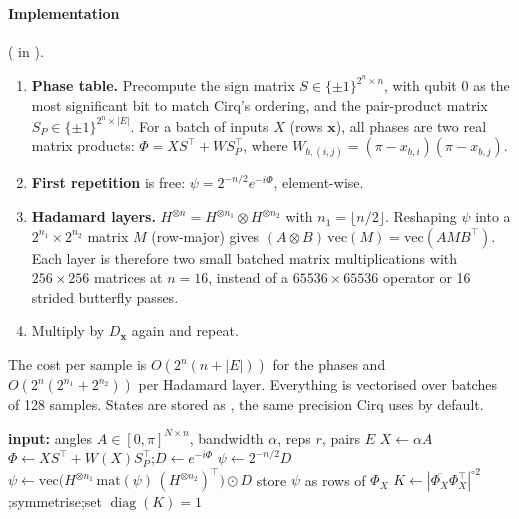 \paragraph{Implementation} ( in ).
\begin{enumerate}
\item \textbf{Phase table.} Precompute the sign matrix $S\in\{\pm1\}^{2^n\times n}$, with qubit 0
      as the most significant bit to match Cirq's ordering, and the pair-product matrix
      $S_P\in\{\pm1\}^{2^n\times|E|}$. For a batch of inputs $X$ (rows $\bm x$), all phases are
      two real matrix products:
      $\Phi = X S^\top + W S_P^\top$, where $W_{b,(i,j)}=(\pi-x_{b,i})(\pi-x_{b,j})$.
\item \textbf{First repetition} is free: $\psi=2^{-n/2}e^{-i\Phi}$, element-wise.
\item \textbf{Hadamard layers.} $H^{\otimes n}=H^{\otimes n_1}\otimes H^{\otimes n_2}$ with
      $n_1=\lfloor n/2\rfloor$. Reshaping $\psi$ into a $2^{n_1}\times2^{n_2}$ matrix $M$ (row-major)
      gives $(A\otimes B)\,\mathrm{vec}(M)=\mathrm{vec}(AMB^\top)$. Each layer is therefore two
      small batched matrix multiplications with $256\times256$ matrices at $n=16$, instead of a
      $65536\times65536$ operator or 16 strided butterfly passes.
\item Multiply by $D_{\bm x}$ again and repeat.
\end{enumerate}
The cost per sample is $O(2^n(n+|E|))$ for the phases and $O(2^n(2^{n_1}+2^{n_2}))$ per Hadamard
layer. Everything is vectorised over batches of 128 samples. States are stored as
, the same precision Cirq uses by default.

\begin{algorithm}[H]
\caption{Training kernel with the fast engine}
\begin{algorithmic}
\STATE \textbf{input:} angles $A\in[0,\pi]^{N\times n}$, bandwidth $\alpha$, reps $r$, pairs $E$
\STATE $X\leftarrow\alpha A$
  \STATE $\Phi\leftarrow XS^\top+W(X)S_P^\top$;\quad $D\leftarrow e^{-i\Phi}$
  \STATE $\psi\leftarrow 2^{-n/2}D$
     \STATE $\psi\leftarrow \mathrm{vec}\big(H^{\otimes n_1}\,\mathrm{mat}(\psi)\,(H^{\otimes n_2})^{\top}\big)\odot D$
  \ENDFOR
  \STATE store $\psi$ as rows of $\Phi_X$
\ENDFOR
\STATE $K\leftarrow|\overline{\Phi_X}\Phi_X^\top|^{\circ 2}$;\quad symmetrise;\quad set $\operatorname{diag}(K)=1$
\end{algorithmic}
\end{algorithm}

